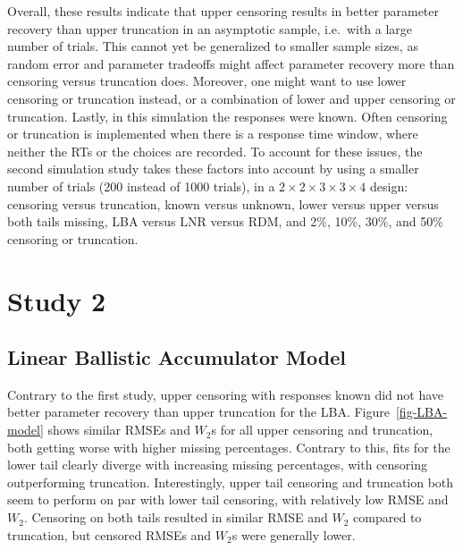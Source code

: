 \documentclass[
  stu,
  floatsintext,
  longtable,
  nolmodern,
  notxfonts,
  notimes,
  draftfirst,
  colorlinks=true,linkcolor=blue,citecolor=blue,urlcolor=blue]{apa7}
\begin{document}
Overall, these results indicate that upper censoring results in better
parameter recovery than upper truncation in an asymptotic sample,
i.e.~with a large number of trials. This cannot yet be generalized to
smaller sample sizes, as random error and parameter tradeoffs might
affect parameter recovery more than censoring versus truncation does.
Moreover, one might want to use lower censoring or truncation instead,
or a combination of lower and upper censoring or truncation. Lastly, in
this simulation the responses were known. Often censoring or truncation
is implemented when there is a response time window, where neither the
RTs or the choices are recorded. To account for these issues, the second
simulation study takes these factors into account by using a smaller
number of trials (200 instead of 1000 trials), in a
\(2 \times 2 \times 3 \times 3 \times 4\) design: censoring versus
truncation, known versus unknown, lower versus upper versus both tails
missing, LBA versus LNR versus RDM, and 2\%, 10\%, 30\%, and 50\%
censoring or truncation.

\section{Study 2}\label{study-2}

\subsection{Linear Ballistic Accumulator
Model}\label{linear-ballistic-accumulator-model}

Contrary to the first study, upper censoring with responses known did
not have better parameter recovery than upper truncation for the LBA.
Figure~\ref{fig-LBA-model} shows similar RMSEs and \(W_2\)s for all
upper censoring and truncation, both getting worse with higher missing
percentages. Contrary to this, fits for the lower tail clearly diverge
with increasing missing percentages, with censoring outperforming
truncation. Interestingly, upper tail censoring and truncation both seem
to perform on par with lower tail censoring, with relatively low RMSE
and \(W_2\). Censoring on both tails resulted in similar RMSE and
\(W_2\) compared to truncation, but censored RMSEs and \(W_2\)s were
generally lower.
\end{document}
